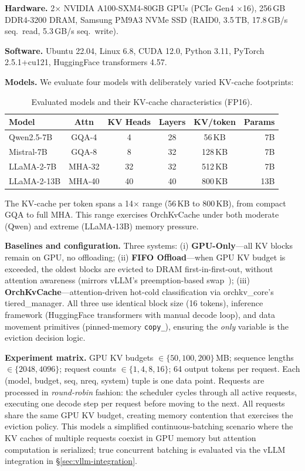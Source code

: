 \documentclass[conference]{IEEEtran}
\begin{document}
\textbf{Hardware.} 2$\times$ NVIDIA A100-SXM4-80GB GPUs (PCIe Gen4 $\times$16), 256\,GB DDR4-3200 DRAM, Samsung PM9A3 NVMe SSD (RAID0, 3.5\,TB, 17.8\,GB/s seq.\ read, 5.3\,GB/s seq.\ write).

\textbf{Software.} Ubuntu 22.04, Linux 6.8, CUDA 12.0, Python 3.11, PyTorch 2.5.1+cu121, HuggingFace transformers 4.57.

\textbf{Models.} We evaluate four models with deliberately varied KV-cache footprints:

\begin{table}[t]
\centering
\caption{Evaluated models and their KV-cache characteristics (FP16).}
\label{tab:models}
\small
\begin{tabular}{@{}lccccr@{}}
\toprule
Model & Attn & KV Heads & Layers & KV/token & Params \\
\midrule
Qwen2.5-7B   & GQA-4  & 4  & 28 & 56\,KB  & 7B  \\
Mistral-7B   & GQA-8  & 8  & 32 & 128\,KB & 7B  \\
LLaMA-2-7B   & MHA-32 & 32 & 32 & 512\,KB & 7B  \\
LLaMA-2-13B  & MHA-40 & 40 & 40 & 800\,KB & 13B \\
\bottomrule
\end{tabular}
\end{table}

The KV-cache per token spans a 14$\times$ range (56\,KB to 800\,KB), from compact GQA to full MHA. This range exercises OrchKvCache under both moderate (Qwen) and extreme (LLaMA-13B) memory pressure.

\textbf{Baselines and configuration.} Three systems: (i) \textbf{GPU-Only}---all KV blocks remain on GPU, no offloading; (ii) \textbf{FIFO Offload}---when GPU KV budget is exceeded, the oldest blocks are evicted to DRAM first-in-first-out, without attention awareness (mirrors vLLM's preemption-based swap~\cite{vllm}); (iii) \textbf{OrchKvCache}---attention-driven hot-cold classification via orchkv\_core's tiered\_manager. All three use identical block size (16 tokens), inference framework (HuggingFace transformers with manual decode loop), and data movement primitives (pinned-memory \texttt{copy\_}), ensuring the \emph{only} variable is the eviction decision logic.

\textbf{Experiment matrix.} GPU KV budgets $\in \{50, 100, 200\}$\,MB; sequence lengths $\in \{2048, 4096\}$; request counts $\in \{1, 4, 8, 16\}$; 64 output tokens per request. Each (model, budget, seq, nreq, system) tuple is one data point. Requests are processed in \emph{round-robin} fashion: the scheduler cycles through all active requests, executing one decode step per request before moving to the next. All requests share the same GPU KV budget, creating memory contention that exercises the eviction policy. This models a simplified continuous-batching scenario where the KV caches of multiple requests coexist in GPU memory but attention computation is serialized; true concurrent batching is evaluated via the vLLM integration in \S\ref{sec:vllm-integration}.
\end{document}
